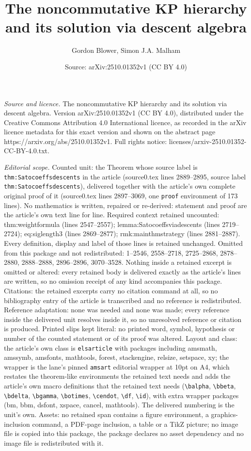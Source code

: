 \documentclass[10pt,a4paper]{amsart}
\title[The noncommutative KP hierarchy and its solution via descent]{The noncommutative KP hierarchy and its solution via descent algebra}
\author{Gordon Blower, Simon J.A. Malham}
\date{Source: arXiv:2510.01352v1 (CC BY 4.0)}
\begin{document}
\maketitle

\noindent\emph{Source and licence.} The noncommutative KP hierarchy and its solution via descent algebra. Version arXiv:2510.01352v1 (CC BY 4.0), distributed under the Creative Commons Attribution 4.0 International licence, as recorded in the arXiv licence metadata for this exact version and shown on the abstract page https://arxiv.org/abs/2510.01352v1. Full rights notice: licenses/arxiv-2510.01352-CC-BY-4.0.txt.\par\smallskip

\noindent\textit{Editorial scope.} Counted unit: the Theorem whose source label is \texttt{thm:Satocoeffsdescents} in the article (source0.tex lines 2889--2895, source label \texttt{thm:Satocoeffsdescents}), delivered together with the article's own complete original proof of it (source0.tex lines 2897--3069, one \texttt{proof} environment of 173 lines). No mathematics is written, repaired or re-derived: statement and proof are the article's own text line for line. Required context retained uncounted: thm:weightformula (lines 2547--2557); lemma:Satocoeffsviadescents (lines 2719--2724); eq:siglength3 (lines 2869--2877); rmk:mainthmstrategy (lines 2881--2887). Every definition, display and label of those lines is retained unchanged. Omitted from this package and not redistributed: 1--2546, 2558--2718, 2725--2868, 2878--2880, 2888--2888, 2896--2896, 3070--3528. Nothing inside a retained excerpt is omitted or altered: every retained body is delivered exactly as the article's lines are written, so no omission receipt of any kind accompanies this package. Citations: the retained excerpts carry no citation command at all, so no bibliography entry of the article is transcribed and no reference is redistributed. Reference adaptation: none was needed and none was made; every reference inside the delivered unit resolves inside it, so no unresolved reference or citation is produced. Printed slips kept literal: no printed word, symbol, hypothesis or number of the counted statement or of its proof was altered. Layout and class: the article's own class is \texttt{elsarticle} with packages including amsmath, amssymb, amsfonts, mathtools, forest, stackengine, relsize, setspace, xy; the wrapper is the lane's pinned \texttt{amsart} editorial wrapper at 10pt on A4, which restates the theorem-like environments the retained text needs and adds the article's own macro definitions that the retained text needs (\texttt{\textbackslash balpha}, \texttt{\textbackslash bbeta}, \texttt{\textbackslash bdelta}, \texttt{\textbackslash bgamma}, \texttt{\textbackslash botimes}, \texttt{\textbackslash cendot}, \texttt{\textbackslash df}, \texttt{\textbackslash id}), with extra wrapper packages (bm, bbm, dsfont, xspace, cancel, mathtools). The delivered numbering is the unit's own. Assets: no retained span contains a figure environment, a graphics-inclusion command, a PDF-page inclusion, a table or a TikZ picture; no image file is copied into this package, the package declares no asset dependency and no image file is redistributed with it. 
\end{document}

